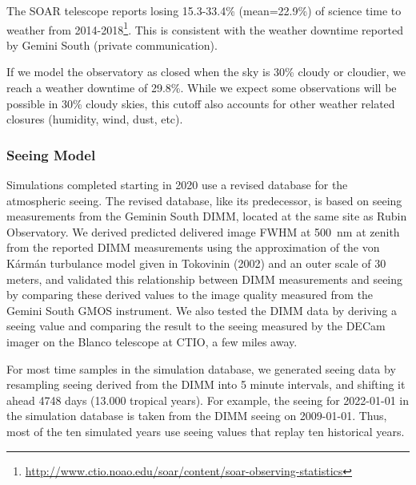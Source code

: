 The SOAR telescope reports losing 15.3-33.4\% (mean=22.9\%) of science time to weather from 2014-2018\footnote{\url{http://www.ctio.noao.edu/soar/content/soar-observing-statistics}}. This is consistent with the weather downtime reported by Gemini South (private communication). 

If we model the observatory as closed when the sky is 30\% cloudy or cloudier, we reach a weather downtime of 29.8\%. While we expect some observations will be possible in 30\% cloudy skies, this cutoff also accounts for other weather related closures (humidity, wind, dust, etc).

\subsubsection{Seeing Model}

Simulations completed starting in 2020 use a revised database for the atmospheric seeing. The revised database, like its predecessor, is based on seeing measurements from the Geminin South DIMM, located at the same site as Rubin Observatory. We derived predicted delivered image FWHM at 500~nm at zenith from the reported DIMM measurements using the approximation of the von K\'arm\'an turbulance model given in Tokovinin (2002) and an outer scale of 30 meters, and validated this relationship between DIMM measurements and seeing by comparing these derived values to the image quality measured from the Gemini South GMOS instrument. We also tested the DIMM data by deriving a seeing value and comparing the result to the seeing measured by the DECam imager on the Blanco telescope at CTIO, a few miles away.

For most time samples in the simulation database, we generated seeing data by resampling seeing derived from the DIMM into 5 minute intervals, and shifting it ahead 4748 days (13.000 tropical years). For example, the seeing for 2022-01-01 in the simulation database is taken from the DIMM seeing on 2009-01-01. Thus, most of the ten simulated years use seeing values that replay ten historical years.

